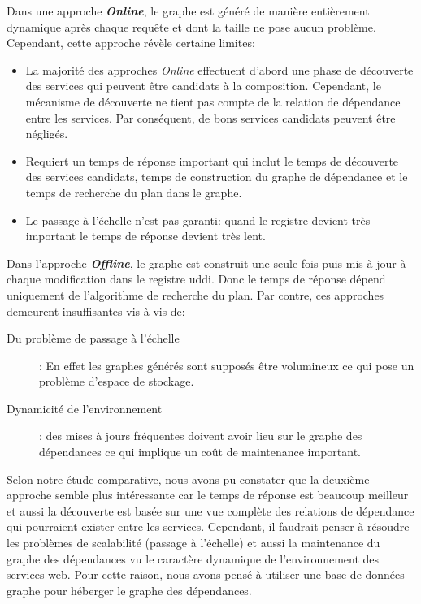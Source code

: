   Dans une approche \textbf{\textit{Online}}, le graphe est généré de
  manière entièrement dynamique après chaque requête et dont la taille
  ne pose aucun problème. Cependant, cette approche révèle certaine
  limites:

  \SpecialItem
  \begin{itemize}
  \item La majorité des approches \textit{Online} effectuent d'abord une
    phase de découverte des services qui peuvent être candidats à la
    composition. Cependant, le mécanisme de découverte ne tient pas
    compte de la relation de dépendance entre les services. Par
    conséquent, de bons services candidats peuvent être négligés.

  \item Requiert un temps de réponse important qui inclut le temps de
    découverte des services candidats, temps de construction du graphe
    de dépendance et le temps de recherche du plan dans le graphe.

  \item Le passage à l'échelle n'est pas garanti: quand le registre
    devient très important le temps de réponse devient très
    lent.\bigskip

  \end{itemize}
  \enddescription

  Dans l'approche \textbf{\textit{Offline}}, le graphe est construit une
  seule fois puis mis à jour à chaque modification dans le registre
  \acrshort{uddi}. Donc le temps de réponse dépend uniquement de
  l'algorithme de recherche du plan. Par contre, ces approches
  demeurent insuffisantes vis-à-vis de:\medskip

  \begin{description}
  \item [Du problème de passage à l'échelle]: En effet les graphes
    générés sont supposés être volumineux ce qui pose un problème
    d'espace de stockage.

  \item [Dynamicité de l'environnement]: des mises à jours fréquentes
    doivent avoir lieu sur le graphe des dépendances ce qui implique un
    coût de maintenance important.\bigskip

  \end{description}



Selon notre étude comparative, nous avons pu constater que la deuxième
approche semble plus intéressante car le temps de réponse est beaucoup
meilleur et aussi la découverte est basée sur une vue complète des
relations de dépendance qui pourraient exister entre les services.
Cependant, il faudrait penser à résoudre les problèmes de scalabilité
(passage à l'échelle) et aussi la maintenance du graphe des dépendances
vu le caractère dynamique de l'environnement des services web.  Pour
cette raison, nous avons pensé à utiliser une base de données graphe
pour héberger le graphe des dépendances.

